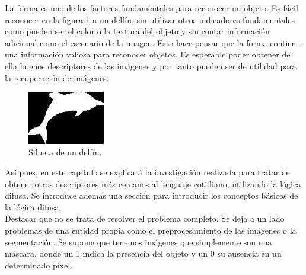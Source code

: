 La forma es uno de los factores fundamentales para reconocer un objeto. Es fácil reconocer en la figura \ref{delfin} a un delfín, sin utilizar otros indicadores fundamentales como pueden ser el color o la textura del objeto y sin contar información adicional como el escenario de la imagen. Esto hace pensar que la forma contiene una información valiosa para reconocer objetos. Es esperable poder obtener de ella buenos descriptores de las imágenes y por tanto pueden ser de utilidad para la recuperación de imágenes.\\


\begin{figure}[H]
\begin{center}

\includegraphics[width=0.3\textwidth]{img/delfin.jpg}
\end{center}

\caption{Silueta de un delfín.}
\label{delfin}
\end{figure}

Así pues, en este capítulo se explicará la investigación realizada para tratar de obtener otros descriptores más cercanos al lenguaje cotidiano, utilizando la lógica difusa. Se introduce además una sección para introducir los conceptos básicos de la lógica difusa.\\

Destacar que no se trata de resolver el problema completo. Se deja a un lado problemas de una entidad propia como el preprocesamiento de las imágenes o la segmentación. Se supone que tenemos imágenes que simplemente son una máscara, donde un 1 indica la presencia del objeto y un 0 su ausencia en un determinado píxel.